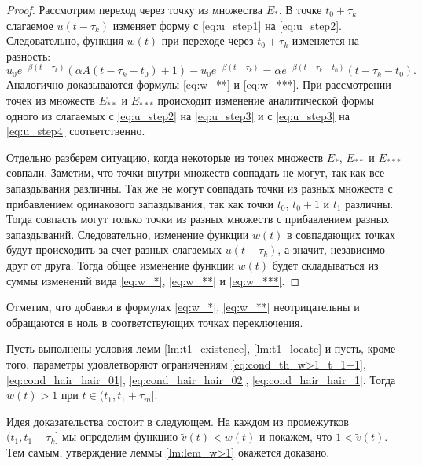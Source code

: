 \begin{proof}
	
	Рассмотрим переход через точку из множества $E_*$. В точке $t_0 + \tau_k$ слагаемое $u(t - \tau_k)$ изменяет форму с \eqref{eq:u_step1} %
	на \eqref{eq:u_step2}. %
	Следовательно, функция $w(t)$ при переходе через $t_0 + \tau_k$ изменяется на разность:
	\[u_0 e^{-\beta( t-\tau_k)}(\alpha A(t - \tau_k - t_0)+1) - u_0e^{-\beta( t - \tau_k)}= \alpha e^{-\beta( t-\tau_k-t_0)}(t-\tau_k-t_0).\]
	Аналогично доказываются формулы \eqref{eq:w_**} и \eqref{eq:w_***}. При рассмотрении точек из множеств $E_{**}$ и $E_{***}$ происходит изменение аналитической формы одного из слагаемых с \eqref{eq:u_step2} на \eqref{eq:u_step3} и с \eqref{eq:u_step3} на \eqref{eq:u_step4} соответственно.
	
	Отдельно разберем ситуацию, когда некоторые из точек множеств $E_*$, $E_{**}$ и $E_{***}$ совпали. Заметим, что точки внутри множеств совпадать не могут, так как все запаздывания различны. Так же не могут совпадать точки из разных множеств с прибавлением одинакового запаздывания, так как точки $t_0$, $t_0 + 1$ и $t_1$ различны. Тогда совпасть могут только точки из разных множеств  с прибавлением разных запаздываний. Следовательно, изменение функции $w(t)$ в совпадающих точках будут происходить за счет разных слагаемых $u(t-\tau_k)$, а значит, независимо друг от друга. Тогда общее изменение функции $w(t)$ будет складываться из суммы изменений вида \eqref{eq:w_*}, \eqref{eq:w_**} и \eqref{eq:w_***}.
\end{proof}


Отметим, что добавки в формулах \eqref{eq:w_*}, \eqref{eq:w_**} неотрицательны и обращаются в ноль в соответствующих точках переключения.

\begin{lemma}
	\label{lm:lem_w>1}
	Пусть выполнены условия лемм \ref{lm:t1_existence}, \ref{lm:t1_locate} и пусть, кроме того,
	параметры удовлетворяют ограничениям \eqref{eq:cond_th_w>1_t_1+1}, \eqref{eq:cond_hair_hair_01}, \eqref{eq:cond_hair_hair_02}, \eqref{eq:cond_hair_hair_1}.
	Тогда $w(t)>1$ при $t\in(t_1,t_1+\tau_m]$.
\end{lemma}

Идея доказательства состоит в следующем. На каждом из промежутков $(t_1, t_1+\tau_k]$ мы определим функцию $\tilde{v}(t) < w(t)$ и покажем, что $1 < \tilde{v}(t)$. Тем самым, утверждение леммы \ref{lm:lem_w>1} окажется доказано.

